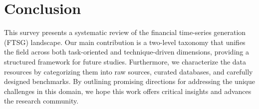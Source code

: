 \section{Conclusion} 
\label{sec:11}
This survey presents a systematic review of the financial time-series generation (FTSG) landscape. Our main contribution is a two-level taxonomy that unifies the field across both task-oriented and technique-driven dimensions, providing a structured framework for future studies.
Furthermore, we characterize the data resources by categorizing them into raw sources, curated databases, and carefully designed benchmarks. By outlining promising directions for addressing the unique challenges in this domain, we hope this work offers critical insights and advances the research community.

